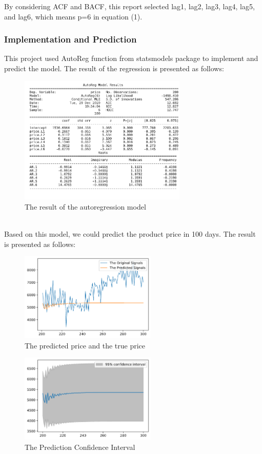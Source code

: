 \documentclass{article}
\begin{document}
By considering ACF and BACF, this report selected lag1, lag2, lag3, lag4, lag5, and lag6, which means p=6 in equation (1).

\subsubsection{Implementation and Prediction}
This project used AutoReg function from statsmodels package to implement and predict the model. The result of the regression is presented as follows:\\
\begin{figure}[htbp]\centering
	\includegraphics[width=8cm]{Auto_res.png}
	\caption{The result of the autoregression model}
	\label{fig: Auto regression}
\end{figure}
\\
Based on this model, we could predict the product price in 100 days. The result is presented as follows:
\begin{figure}[htbp]\centering
	\centering\includegraphics[width=6.5cm]{AutoReg_res1.png}
	\caption{The predicted price and the true price}
	\label{fig: AutoReg_res}
\end{figure}

\begin{figure}[htbp]\centering
	\includegraphics[width=6.5cm]{Auto_Conf.png}
	\caption{The Prediction Confidence Interval}
	\label{fig: Auto regression}
\end{figure}
\end{document}
